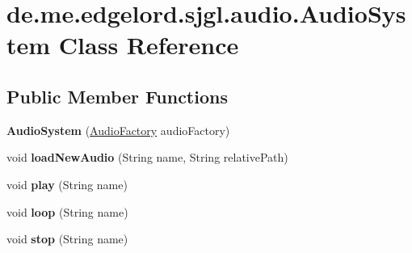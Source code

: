 \hypertarget{classde_1_1me_1_1edgelord_1_1sjgl_1_1audio_1_1_audio_system}{}\section{de.\+me.\+edgelord.\+sjgl.\+audio.\+Audio\+System Class Reference}
\label{classde_1_1me_1_1edgelord_1_1sjgl_1_1audio_1_1_audio_system}
\subsection*{Public Member Functions}
\begin{DoxyCompactItemize}
\item 
\mbox{\label{classde_1_1me_1_1edgelord_1_1sjgl_1_1audio_1_1_audio_system_a332604b3b6fce17335bf6180ba15dd9b}} 
{\bfseries Audio\+System} (\mbox{\hyperlink{classde_1_1me_1_1edgelord_1_1sjgl_1_1factory_1_1_audio_factory}{Audio\+Factory}} audio\+Factory)
\item 
\mbox{\label{classde_1_1me_1_1edgelord_1_1sjgl_1_1audio_1_1_audio_system_a582620714de0dba106d61a4f124ec98e}} 
void {\bfseries load\+New\+Audio} (String name, String relative\+Path)
\item 
\mbox{\label{classde_1_1me_1_1edgelord_1_1sjgl_1_1audio_1_1_audio_system_a60f7bfbf06d563fa48ca7c576508ff6a}} 
void {\bfseries play} (String name)
\item 
\mbox{\label{classde_1_1me_1_1edgelord_1_1sjgl_1_1audio_1_1_audio_system_a54fb3b524cd02fb3da15d2ec4ac3c621}} 
void {\bfseries loop} (String name)
\item 
\mbox{\label{classde_1_1me_1_1edgelord_1_1sjgl_1_1audio_1_1_audio_system_a532ddedf81dc10e84f1a42de07f8dd41}} 
void {\bfseries stop} (String name)
\item 
\mbox{\label{classde_1_1me_1_1edgelord_1_1sjgl_1_1audio_1_1_audio_system_ae993e182cd1fbd5b0e673b530a4ed9b7}} 

\end{DoxyCompactItemize}
